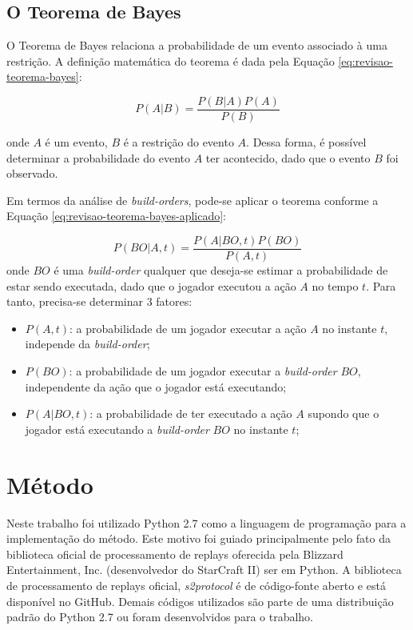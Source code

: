 		\section{O Teorema de Bayes}
O Teorema de Bayes relaciona a probabilidade de um evento associado à uma restrição. A definição matemática do teorema é dada pela Equação \ref{eq:revisao-teorema-bayes}:

\begin{equation}
	P(A|B) = \frac{P(B|A)P(A)}{P(B)}
	\label{eq:revisao-teorema-bayes}
\end{equation}

\noindent onde $A$ é um evento, $B$ é a restrição do evento $A$. Dessa forma, é possível determinar a probabilidade do evento $A$ ter acontecido, dado que o evento $B$ foi observado.

Em termos da análise de \textit{\glspl{build-order}}, pode-se aplicar o teorema conforme a Equação \ref{eq:revisao-teorema-bayes-aplicado}:

\begin{equation}
	P(BO|A, t) = \frac{P(A|BO, t)P(BO)}{P(A, t)}
	\label{eq:revisao-teorema-bayes-aplicado}
\end{equation}
\noindent onde $BO$ é uma \textit{\gls{build-order}} qualquer que deseja-se estimar a probabilidade de estar sendo executada, dado que o jogador executou a ação $A$ no tempo $t$. Para tanto, precisa-se determinar 3 fatores:

\begin{itemize}
	\item $P(A, t)$: a probabilidade de um jogador executar a ação $A$ no instante $t$, independe da \textit{\gls{build-order}};
	\item $P(BO)$: a probabilidade de um jogador executar a \textit{\gls{build-order}} $BO$, independente da ação que o jogador está executando;
	\item $P(A|BO, t)$: a probabilidade de ter executado a ação $A$ supondo que o jogador está executando a \textit{\gls{build-order}} $BO$ no instante $t$;
\end{itemize}

	\chapter{Método}
Neste trabalho foi utilizado Python 2.7 como a linguagem de programação para a implementação do método. Este motivo foi guiado principalmente pelo fato da biblioteca oficial de processamento de \glspl{replay} oferecida pela Blizzard Entertainment, Inc. (desenvolvedor do StarCraft II) ser em Python. A biblioteca de processamento de \glspl{replay} oficial, \textit{s2protocol}\cite{s2protocol} é de código-fonte aberto e está disponível no GitHub. Demais códigos utilizados são parte de uma distribuição padrão do Python 2.7 ou foram desenvolvidos para o trabalho.

